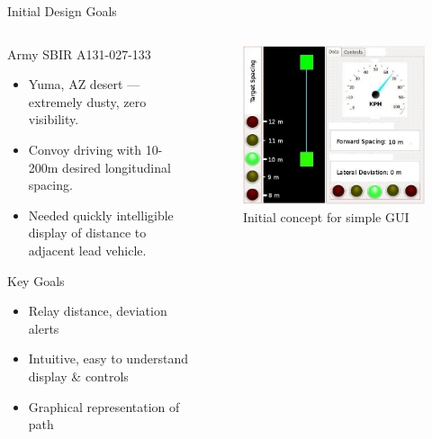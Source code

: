 \documentclass{beamer}
\begin{document}
    \begin{frame}{Initial Design Goals}
      \begin{columns}
        \begin{column}{0.5\linewidth}
          Army SBIR A131-027-133
          \begin{itemize} \footnotesize
            \item Yuma, AZ desert --- extremely dusty, zero visibility.
            \item Convoy driving with 10-200m desired longitudinal spacing.
            \item Needed quickly intelligible display of distance to adjacent lead vehicle.
          \end{itemize}
          Key Goals
          \begin{itemize} \footnotesize
            \item Relay distance, deviation alerts
            \item Intuitive, easy to understand display \& controls
            \item Graphical representation of path
          \end{itemize}
        \end{column}
        \begin{column}{0.5\linewidth}
          \begin{figure}
            \includegraphics[width=\textwidth]{../graphics/initial_concept.png}
            \caption{\footnotesize Initial concept for simple GUI}
          \end{figure}
        \end{column}
      \end{columns}
    \end{frame}
\end{document}
